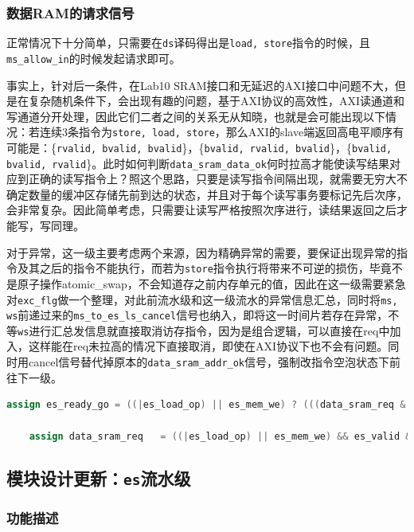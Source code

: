 \documentclass[UTF-8,twoside,c5size]{ctexart}
\begin{document}
	\subsubsection{数据RAM的请求信号}
	
	正常情况下十分简单，只需要在\texttt{ds}译码得出是\texttt{load, store}指令的时候，且\texttt{ms_allow_in}的时候发起请求即可。
	
	事实上，针对后一条件，在Lab10 SRAM接口和无延迟的AXI接口中问题不大，但是在复杂随机条件下，会出现有趣的问题，基于AXI协议的高效性，AXI读通道和写通道分开处理，因此它们二者之间的关系无从知晓，也就是会可能出现以下情况：若连续3条指令为\texttt{store, load, store}，那么AXI的slave端返回高电平顺序有可能是：\{\texttt{rvalid, bvalid, bvalid}\}，\{\texttt{bvalid, rvalid, bvalid}\}，\{\texttt{bvalid, bvalid, rvalid}\}。此时如何判断\texttt{data_sram_data_ok}何时拉高才能使读写结果对应到正确的读写指令上？照这个思路，只要是读写指令间隔出现，就需要无穷大不确定数量的缓冲区存储先前到达的状态，并且对于每个读写事务要标记先后次序，会非常复杂。因此简单考虑，只需要让读写严格按照次序进行，读结果返回之后才能写，写同理。
	
	对于异常，这一级主要考虑两个来源，因为精确异常的需要，要保证出现异常的指令及其之后的指令不能执行，而若为\texttt{store}指令执行将带来不可逆的损伤，毕竟不是原子操作atomic_swap，不会知道存之前内存单元的值，因此在这一级需要紧急对\texttt{exc_flg}做一个整理，对此前流水级和这一级流水的异常信息汇总，同时将\texttt{ms, ws}前递过来的\texttt{ms_to_es_ls_cancel}信号也纳入，即将这一时间片若存在异常，不等\texttt{ws}进行汇总发信息就直接取消访存指令，因为是组合逻辑，可以直接在req中加入，这样能在req未拉高的情况下直接取消，即使在AXI协议下也不会有问题。同时用cancel信号替代掉原本的\texttt{data_sram_addr_ok}信号，强制改指令空泡状态下前往下一级。
	
	\begin{lstlisting}[language=verilog]
	assign es_ready_go = ((|es_load_op) || es_mem_we) ? (((data_sram_req & data_sram_addr_ok) | ls_cancel)) : (~(is_div & ~div_es_go));

	assign data_sram_req   = ((|es_load_op) || es_mem_we) && es_valid && ~(wb_exc | wb_ertn | wb_exc_r | wb_ertn_r) && ~ls_cancel && ms_allowin;
	\end{lstlisting}

	\subsection{模块设计更新：\texttt{es}流水级}
	
	\subsubsection{功能描述}
	
\end{document}
